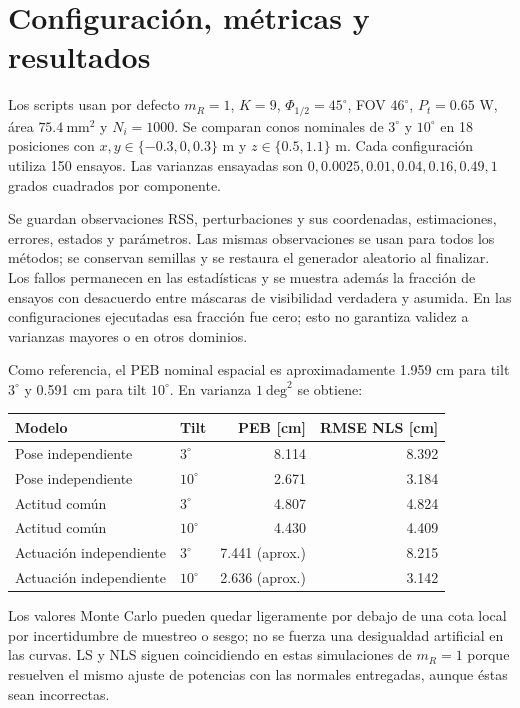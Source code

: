 \documentclass[11pt,a4paper]{article}
\begin{document}
\section{Configuración, métricas y resultados}
Los scripts usan por defecto $m_R=1$, $K=9$, $\Phi_{1/2}=45^\circ$, FOV $46^\circ$, $P_t=0.65$ W, área $75.4\ \mathrm{mm}^2$ y $N_i=1000$. Se comparan conos nominales de $3^\circ$ y $10^\circ$ en 18 posiciones con $x,y\in\{-0.3,0,0.3\}$ m y $z\in\{0.5,1.1\}$ m. Cada configuración utiliza 150 ensayos. Las varianzas ensayadas son $0,0.0025,0.01,0.04,0.16,0.49,1$ grados cuadrados por componente.

Se guardan observaciones RSS, perturbaciones y sus coordenadas, estimaciones, errores, estados y parámetros. Las mismas observaciones se usan para todos los métodos; se conservan semillas y se restaura el generador aleatorio al finalizar. Los fallos permanecen en las estadísticas y se muestra además la fracción de ensayos con desacuerdo entre máscaras de visibilidad verdadera y asumida. En las configuraciones ejecutadas esa fracción fue cero; esto no garantiza validez a varianzas mayores o en otros dominios.

Como referencia, el PEB nominal espacial es aproximadamente 1.959 cm para tilt $3^\circ$ y 0.591 cm para tilt $10^\circ$. En varianza $1\ \mathrm{deg}^2$ se obtiene:
\begin{center}
\begin{tabular}{llrr}
\toprule
Modelo & Tilt & PEB [cm] & RMSE NLS [cm] \\
\midrule
Pose independiente & $3^\circ$ & 8.114 & 8.392 \\
Pose independiente & $10^\circ$ & 2.671 & 3.184 \\
Actitud común & $3^\circ$ & 4.807 & 4.824 \\
Actitud común & $10^\circ$ & 4.430 & 4.409 \\
Actuación independiente & $3^\circ$ & 7.441 (aprox.) & 8.215 \\
Actuación independiente & $10^\circ$ & 2.636 (aprox.) & 3.142 \\
\bottomrule
\end{tabular}
\end{center}
Los valores Monte Carlo pueden quedar ligeramente por debajo de una cota local por incertidumbre de muestreo o sesgo; no se fuerza una desigualdad artificial en las curvas. LS y NLS siguen coincidiendo en estas simulaciones de $m_R=1$ porque resuelven el mismo ajuste de potencias con las normales entregadas, aunque éstas sean incorrectas.
\end{document}
